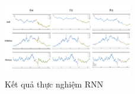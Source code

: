 \begin{figure}[htbp]
\centerline{\includegraphics[width=0.5\textwidth]{img/RNN_result.png}}
\caption{Kết quả thực nghiệm RNN}
\label{fig}
\end{figure}